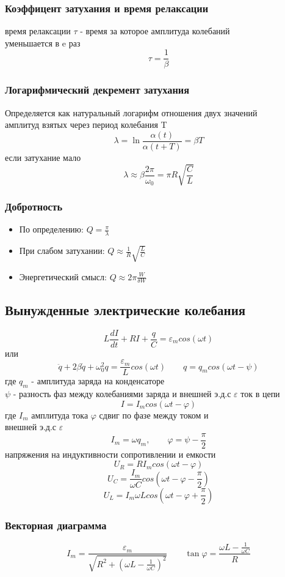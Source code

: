 \documentclass{article}
\begin{document}
\subsubsection{
    Коэффицент затухания и время релаксации
}
время релаксации  $\tau$ - время за которое амплитуда колебаний\\
уменьшается в e раз
\[\tau = \frac{1}{\beta}\]
\subsubsection{
    Логарифмический декремент затухания
}
Определяется как натуральный логарифм отношения двух значений \\
амплитуд взятых через период колебания T
\[\lambda = \ln{\frac{\alpha(t)}{\alpha(t + T)}} = \beta T\]
если затухание мало 
\[\lambda \approx \beta \frac{2\pi}{\omega_0} = \pi R \sqrt{\frac{C}{L}}\]
\subsubsection{
    Добротность
}
\begin{itemize}
    \item По определению: $Q = \frac{\pi}{\lambda}$
    \item При слабом затухании: $Q \approx \frac{1}{R}\sqrt{\frac{L}{C}}$
    \item Энергетический смысл: $Q \approx 2\pi \frac{W}{\delta W}$
\end{itemize}
\subsection{
    Вынужденные электрические колебания
}
\[L\frac{dI}{dt} + RI + \frac{q}{C} = \varepsilon_m cos(\omega t)\]
или
\[\ddot{q} + 2\beta\dot{q} + \omega_0^2 q = \frac{\varepsilon_m}{L} cos(\omega t) \qquad q = q_m cos(\omega t - \psi)\]
где $q_m$ - амплитуда заряда на конденсаторе\\
$\psi$ - разность фаз между колебаниями заряда и внешней э.д.с $\varepsilon$
ток в цепи
\[I = I_m cos (\omega t - \varphi)\]
где $I_m$ амплитуда тока $\varphi$ сдвиг по фазе между током и\\
внешней э.д.с $\varepsilon$
\[I_m = \omega q_m, \qquad \varphi = \psi - \frac{\pi}{2}\]
напряжения на индуктивности сопротивлении и емкости
\[U_R = RI_mcos(\omega t - \varphi)\]
\[U_C = \frac{I_m}{\omega C} cos(\omega t - \varphi - \frac{\pi}{2})\]
\[U_L = {I_m\omega L} cos(\omega t - \varphi + \frac{\pi}{2})\]
\subsubsection{
    Векторная диаграмма
}
\[I_m = \frac{\varepsilon_m}{\sqrt{R^2 + (\omega L - \frac{1}{\omega C})^2}} \qquad \tan \varphi = \frac{\omega L - \frac{1}{\omega C}}{R}\]
\end{document}
